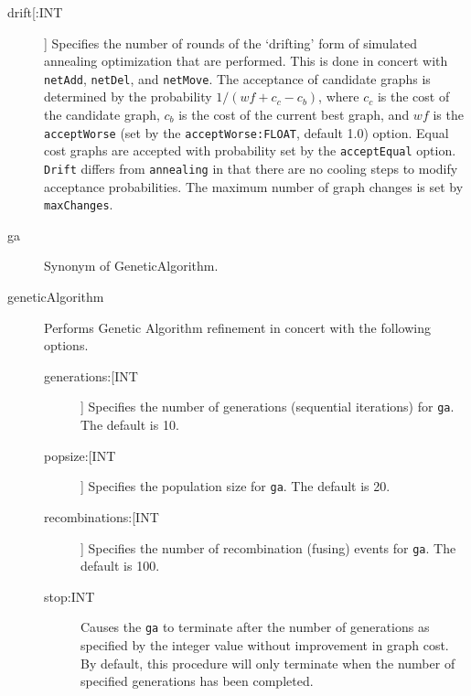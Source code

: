 \begin{description}
		\item[drift[:INT]] Specifies the number of rounds of the `drifting' form of simulated 
		annealing optimization \citep{goloboff1999} that are performed. This is done in concert 
		with \texttt{netAdd}, \texttt{netDel}, and \texttt{netMove}. The acceptance of candidate 
		graphs is determined by the probability $1/ (wf + c_c - c_b)$, where $c_c$ is the cost 
		of the candidate graph, $c_b$ is the cost of the current best graph, and $wf$ is the 
		\texttt{acceptWorse} (set by the \texttt{acceptWorse:FLOAT}, default 1.0) option. Equal 
		cost graphs are accepted with probability set by the \texttt{acceptEqual} option. 
		\texttt{Drift} differs from \texttt{annealing} in that there are no cooling steps to modify 
		acceptance probabilities. The maximum number of graph changes is set by 
		\texttt{maxChanges}.
				
		\item[ga] Synonym of GeneticAlgorithm.
		
		\item[geneticAlgorithm] Performs Genetic Algorithm \citep{Holland1975} refinement in 
		concert with the following options.
					
			\begin{description}
			
			\item[generations:[INT]] Specifies the number of generations (sequential iterations) for 
			\texttt{ga}. The default is 10.

			\item[popsize:[INT]] Specifies the population size for \texttt{ga}. The default is 
			20.
			
			\item[recombinations:[INT]] Specifies the number of recombination (fusing) events for 
			\texttt{ga}. The default is 100.
			
			
			\item[stop:INT] Causes the \texttt{ga} to terminate after the number of 
			generations as specified by the integer value without improvement in graph 
			cost.  By default, this procedure will only terminate when the number of specified 
			generations has been completed.
			\end{description}
		

\end{description}
